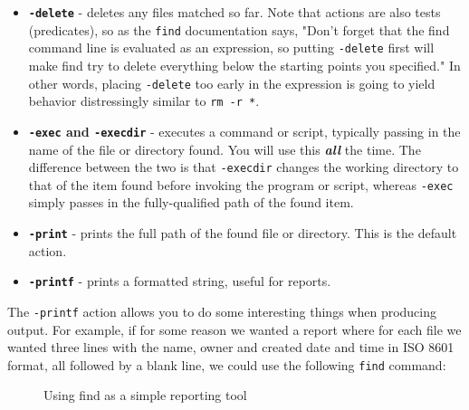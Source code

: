 \documentclass[10pt,american,]{book}
\newenvironment{Shaded}{\begin{snugshade}}{\end{snugshade}}
\newcommand{\KeywordTok}[1]{\textcolor[rgb]{0.13,0.29,0.53}{\textbf{{#1}}}}
\newcommand{\StringTok}[1]{\textcolor[rgb]{0.31,0.60,0.02}{{#1}}}
\newcommand{\NormalTok}[1]{{#1}}
\numberwithin{figure}{chapter}
\DeclareRobustCommand{\drcap}[1]{\begin{figure}[H]\caption{#1}\end{figure}}
\renewcommand{\KeywordTok}[1]{{#1}}
\renewcommand{\StringTok}[1]{{#1}}
\renewcommand{\NormalTok}[1]{{#1}}
\begin{document}
\begin{itemize}
\item
  \textbf{\texttt{-delete}} - deletes any files matched so far. Note
  that actions are also tests (predicates), so as the \texttt{find}
  documentation says, "Don't forget that the find command line is
  evaluated as an expression, so putting \texttt{-delete} first will
  make find try to delete everything below the starting points you
  specified." In other words, placing \texttt{-delete} too early in the
  expression is going to yield behavior distressingly similar to
  \texttt{rm\ -r\ *}.
\item
  \textbf{\texttt{-exec} and \texttt{-execdir}} - executes a command or
  script, typically passing in the name of the file or directory found.
  You will use this \textbf{\emph{all}} the time. The difference between
  the two is that \texttt{-execdir} changes the working directory to
  that of the item found before invoking the program or script, whereas
  \texttt{-exec} simply passes in the fully-qualified path of the found
  item.
\item
  \textbf{\texttt{-print}} - prints the full path of the found file or
  directory. This is the default action.
\item
  \textbf{\texttt{-printf}} - prints a formatted string, useful for
  reports.
\end{itemize}

The \texttt{-printf} action allows you to do some interesting things
when producing output. For example, if for some reason we wanted a
report where for each file we wanted three lines with the name, owner
and created date and time in ISO 8601 format, all followed by a blank
line, we could use the following \texttt{find} command:

\drcap{Using find as a simple reporting tool}

\begin{Shaded}
\end{Shaded}
\end{document}

